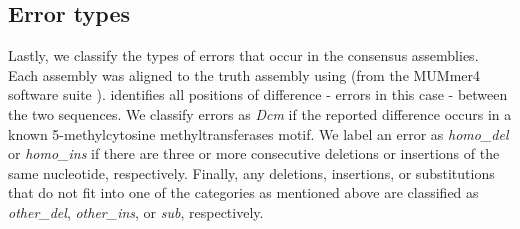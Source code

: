 \begin{table}
\centering
{}
\caption{Consensus BLAST identity summary statistics for the BCG test sample. Where consensus refers to 10kbp "chunks" of the genome assembly produced by the basecalled reads, for each model, mapped to the truth genome. Version indicates the \guppy{} version used for the basecalling before and after training. BLAST identity is the number of matching bases (in a chunk alignment) divided by the length of the alignment. Count refers to the number of consensus chunks assessed. std=standard deviation.}
\label{tab:test-consensus-blast}
\end{table}

\subsection{Error types}
\label{sec:tubby-error-types}

Lastly, we classify the types of errors that occur in the consensus assemblies. Each  assembly was aligned to the truth assembly using  (from the MUMmer4 software suite \cite{mummer2018}).  identifies all positions of difference - errors in this case - between the two sequences. We classify errors as \emph{Dcm} if the reported difference occurs in a known 5-methylcytosine methyltransferases motif. We label an error as \emph{homo\_del} or \emph{homo\_ins} if there are three or more consecutive deletions or insertions of the same nucleotide, respectively. Finally, any deletions, insertions, or substitutions that do not fit into one of the categories as mentioned above are classified as \emph{other\_del}, \emph{other\_ins}, or \emph{sub}, respectively.

